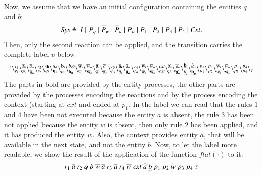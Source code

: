 Now, we assume that we have an initial configuration containing the entities $q$ and $b$:
\[
\begin{array}{lcl}
\mathit{Sys}  \defeq \ %
 I\mid P_q \mid \overline{P}_w  \mid  \overline{P}_a  \mid P_b  \mid  P_1  \mid  P_2  \mid  P_3  \mid P_4  \mid \mathit{Cxt}.
\end{array}
\] 
Then, only the second reaction can be applied, and the transition carries the complete label $\upsilon$ below
{\tiny
\[
 {}^{\tau}
 \backslash_{r_1}^{r_1}
 \backslash_{\overline{a}_i}^{\bf  \overline{a}_i}\backslash_{\bf \overline{a}_o}^{\overline{a}_o}
 \backslash_{r_2}^{r_2}
 \backslash_{q_i}^{\bf q_i}\backslash_{\bf q_o}^{q_o}
 \backslash_{b_i}^{\bf b_i}\backslash_{\bf b_o}^{b_io}
 \backslash_{\overline{w}_i}^{\bf \overline{w}_i}\backslash_{\bf \overline{w}_o}^{\overline{w}_o}
 \backslash_{\overline{a}_i}^{\bf \overline{a}_i}\backslash_{\bf \overline{a}_o}^{\overline{a}_o}
 \backslash_{r_3}^{r_3}
 \backslash_{\overline{a}_i}^{\bf \overline{a}_i}\backslash_{\bf \overline{a}_o}^{\overline{a}_o}
 \backslash_{r_4}^{r_4}
 \backslash_{\overline{w}_i}^{\bf \overline{w}_i}\backslash_{\bf \overline{w}_o}^{\overline{w}_o}
 \backslash_{\mathit{cxt}}^{\mathit{cxt}}
 \backslash_{\widehat{a}_i}^{\bf \widehat{a}_i}\backslash_{\bf \widehat{a}_o}^{\widehat{a}_o}
 \backslash_{\underline{b}_i}^{\bf \underline{b}_i}\backslash_{\bf \underline{b}_o}^{\underline{b}_o}
 \backslash_{p_1}^{p_1}
 \backslash_{p_2}^{p_2}
 \backslash_{\widetilde{w}_i}^{\bf \widetilde{w}_i}\backslash_{\bf \widetilde{w}_o}^{\widetilde{w}_o}
 \backslash_{p_3}^{p_3}
 \backslash_{p_4}^{p_4}
 \backslash_{\tau}
\]}
The parts in bold are provided by the entity processes, the other parts are provided by the processes encoding the reactions and by the process encoding the context (starting at $\mathit{cxt}$ and ended at $p_1$.
In the label we can read that the rules $1$ and $4$ have been not executed because the entity $a$ is absent, 
the rule $3$ has been not applied because the entity $w$ is absent, then only rule $2$ has been applied, and it has produced the entity $w$. Also,  the context provides entity $a$, that will be available in the next state, and not the entity $b$.
Now, to let the label more readable, we show the result of the application of the function $flat(\cdot)$ to it:
\[
r_1~\overline{a}~r_2~q~b~\overline{w}~\overline{a}~r_3~\overline{a}~r_4~\overline{w}~\mathit{cxt}~\widehat{a}~\underline{b}~p_1~p_2~\widetilde{w}~p_3~p_4~\tau\]


